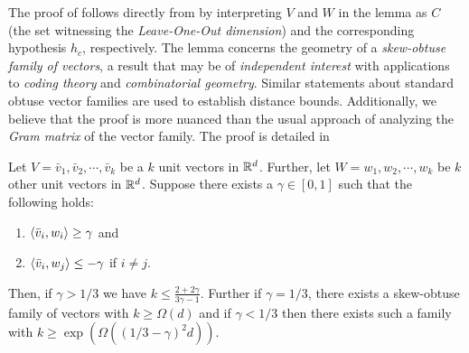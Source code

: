 

The proof of  follows directly from  by interpreting $V$ and $W$ in the lemma as $C$ (the set witnessing the \emph{Leave-One-Out dimension}) and the corresponding hypothesis $h_c$, respectively.
The lemma concerns the geometry of a \emph{skew-obtuse family of vectors}, a result that may be of \emph{independent interest} with applications to \emph{coding theory} and \emph{combinatorial geometry}. Similar statements about standard obtuse vector families are used to establish distance bounds.  
Additionally, we believe that the proof is more {nuanced} than the usual approach of analyzing the \emph{Gram matrix} of the vector family.
The proof is detailed in 


\begin{lemma}
\label{lemma:skew-obtuse_lemma}
    Let $V= \bar{v}_1,\bar{v}_2,\cdots, \bar{v}_k$ be a $k$ unit vectors in $\mathbb{R}^d$. Further, let  $W = w_1,w_2,\cdots, w_k$ be $k$ other unit vectors in $\mathbb{R}^d$. Suppose there exists a $\gamma\in [0,1]$ such that the following holds:
    \begin{enumerate}
        \item $\langle \bar{v}_i, w_i\rangle \geq \gamma$ and
        \item $\langle \bar{v}_i, w_j\rangle \leq -\gamma$ if $i\neq j$.
    \end{enumerate}
     Then, if $\gamma>1/3$ we have $k \leq \frac{2+2\gamma}{3\gamma-1}.$ Further if $\gamma=1/3$, there exists a skew-obtuse family of vectors with $k\geq \Omega(d)$ and if $\gamma<1/3$ then there exists such a family with $k\geq \exp{(\Omega(({1/3-\gamma})^2d))}$.
\end{lemma}

